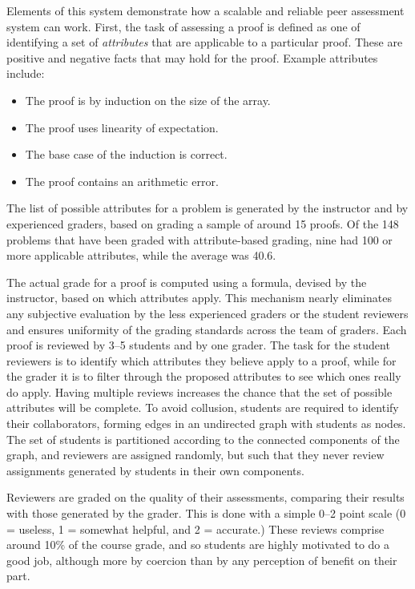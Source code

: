 \documentclass[12pt]{article}
\begin{document}
Elements of this system demonstrate 
how a scalable and reliable peer assessment system can work.  First,
the task of assessing a proof is defined as one of identifying a set of
{\em attributes} that are applicable to a particular proof.  These are
positive and negative facts that may hold for the proof.  Example
attributes include:
\begin{itemize}
\item The proof is by induction on the size of the array.
\item The proof uses linearity of expectation.
\item The base case of the induction is correct.
\item The proof contains an arithmetic error.
\end{itemize}
The list of possible attributes for a problem is generated by the
instructor and by experienced graders, based on grading a sample of
around 15 proofs.  Of the 148 problems that have been graded with
attribute-based grading, nine had 100 or more applicable attributes,
while the average was 40.6.  

The actual grade for a proof is computed using a formula, devised
by the instructor, based on which attributes apply.  This mechanism
nearly eliminates any subjective evaluation by the less experienced graders
or the student reviewers and ensures uniformity of the grading
standards across the team of graders.  Each proof is reviewed by 3--5
students and by one grader.  The task for the student reviewers is to
identify which attributes they believe apply to a proof, while for the
grader it is to filter through the proposed attributes to see which
ones really do apply.  Having multiple reviews increases the chance
that the set of possible attributes will be complete.  To avoid
collusion, students are required to identify their collaborators,
forming edges in an undirected graph with students as nodes.  The
set of students is partitioned according to the connected components
of the graph, and
reviewers are assigned randomly, but such that they never review
assignments generated by students in their own components.

Reviewers are graded on the quality of their assessments, comparing
their results with those generated by the grader.  This is done with a
simple 0--2 point scale (0 = useless, 1 = somewhat helpful, and 2 =
accurate.)  These reviews comprise around 10\% of the course grade,
and so students are highly motivated to do a good job, although more
by coercion than by any perception of benefit on their part.
\end{document}
